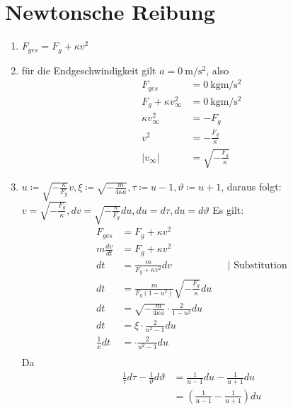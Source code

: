 \documentclass[sectionformat = aufgabe]{gadsescript}
\begin{document}
\maketitle

\section{Newtonsche Reibung}
\begin{enumerate}[label=\alph*)]
	\item $ F_{ges} = F_g + \kappa v^2 $
	\item für die Endgeschwindigkeit gilt $ a = \qty{0}{\metre\per\square\second} $, also
		\begin{align*}
			F_{ges} &= \qty{0}{\kilogram\metre\per\square\second}\\
			F_g + \kappa v_{\infty}^2 &= \qty{0}{\kilogram\metre\per\square\second}\\
			\kappa v_\infty^2 &= -F_g\\
			v^2 &= -\frac{F_g}{\kappa}\\
			|v_\infty| &= \sqrt{-\frac{F_g}{\kappa}}
		\end{align*}
	\item $ u \coloneqq \sqrt{-\frac{\kappa}{F_g}} v, \xi \coloneqq \sqrt{-\frac{m}{4\kappa a}}, \tau \coloneqq u - 1, \vartheta \coloneqq u + 1 $, daraus folgt:\\
		$ v = \sqrt{-\frac{F_g}{\kappa}}, dv = \sqrt{-\frac{\kappa}{F_g}} du, du = d\tau, du = d\vartheta $
		Es gilt:
		\begin{align*}
			F_{ges} &= F_g + \kappa v^2\\
			m \frac{dv}{dt} &= F_g + \kappa v^2\\
			dt &= \frac{m}{F_g + \kappa v^2} dv &&| \text{ Substitution}\\
			dt &= \frac{m}{F_g ( 1 - u^2)} \sqrt{-\frac{F_g}{\kappa}} du\\
			dt &=  \sqrt{-\frac{m}{4\kappa a}} \cdot \frac{2}{ 1 - u^2} du\\
			dt &=  \xi \cdot \frac{2}{u^2 - 1} du\\
			\frac{1}{x}dt &=  \cdot \frac{2}{u^2 - 1} du\\
		\end{align*}
		Da
		\begin{align*}
			\frac{1}{\tau} d\tau - \frac{1}{\vartheta}d\vartheta &= \frac{1}{u - 1}du - \frac{1}{u + 1}du\\
			~&= \left(\frac{1}{u - 1} - \frac{1}{u + 1}\right)du\\

\end{align*}
\end{enumerate}
\end{document}
